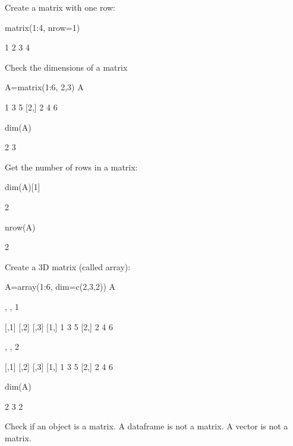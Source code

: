 Create a matrix with one row:
\begin{Schunk}
\begin{Sinput}
 matrix(1:4, nrow=1)
\end{Sinput}
\begin{Soutput}
     [,1] [,2] [,3] [,4]
[1,]    1    2    3    4
\end{Soutput}
\end{Schunk}
Check the dimensions of a matrix
\begin{Schunk}
\begin{Sinput}
 A=matrix(1:6, 2,3)
 A
\end{Sinput}
\begin{Soutput}
     [,1] [,2] [,3]
[1,]    1    3    5
[2,]    2    4    6
\end{Soutput}
\begin{Sinput}
 dim(A)
\end{Sinput}
\begin{Soutput}
[1] 2 3
\end{Soutput}
\end{Schunk}
Get the number of rows in a matrix:
\begin{Schunk}
\begin{Sinput}
 dim(A)[1]
\end{Sinput}
\begin{Soutput}
[1] 2
\end{Soutput}
\begin{Sinput}
 nrow(A)
\end{Sinput}
\begin{Soutput}
[1] 2
\end{Soutput}
\end{Schunk}
Create a 3D matrix (called array):
\begin{Schunk}
\begin{Sinput}
 A=array(1:6, dim=c(2,3,2))
 A
\end{Sinput}
\begin{Soutput}
, , 1

     [,1] [,2] [,3]
[1,]    1    3    5
[2,]    2    4    6

, , 2

     [,1] [,2] [,3]
[1,]    1    3    5
[2,]    2    4    6
\end{Soutput}
\begin{Sinput}
 dim(A)
\end{Sinput}
\begin{Soutput}
[1] 2 3 2
\end{Soutput}
\end{Schunk}
Check if an object is a matrix.  A dataframe is not a matrix.  A vector is not a matrix.
